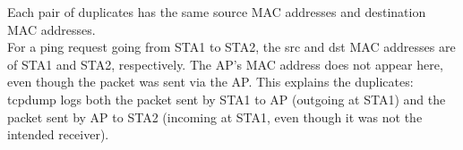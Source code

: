 Each pair of duplicates has the same source MAC addresses and destination MAC addresses. \\ For a ping request going from STA1 to STA2, the src and dst MAC addresses are of STA1 and STA2, respectively. The AP's MAC address does not appear here, even though the packet was sent via the AP. This explains the duplicates: tcpdump logs both the packet sent by STA1 to AP (outgoing at STA1) and the packet sent by AP to STA2 (incoming at STA1, even though it was not the intended receiver).
